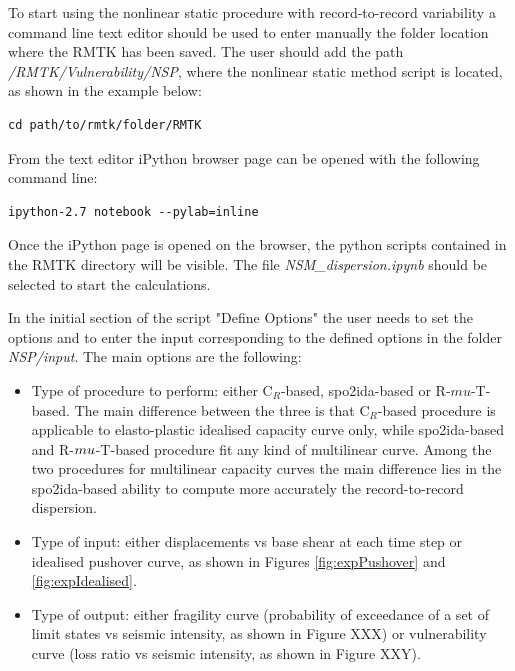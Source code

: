 To start using the nonlinear static procedure with record-to-record variability a command line text editor should be used to enter manually the folder location where the RMTK has been saved. The user should add the path \textit{/RMTK/Vulnerability/NSP}, where the nonlinear static method script is located, as shown in the example below:

\begin{Verbatim}[frame=single, commandchars=\\\{\}, samepage=true]
cd path/to/rmtk/folder/RMTK
\end{Verbatim}

From the text editor iPython browser page can be opened with the following command line:

\begin{Verbatim}[frame=single, commandchars=\\\{\}, samepage=true]
ipython-2.7 notebook --pylab=inline
\end{Verbatim}

Once the iPython page is opened on the browser, the python scripts contained in the RMTK directory will be visible. The file \textit{NSM\_dispersion.ipynb} should be selected to start the calculations.

In the initial section of the script "Define Options" the user needs to set the options and to enter the input corresponding to the defined options in the folder \textit{NSP/input}. The main options are the following:

\begin{itemize}
\item Type of procedure to perform: either C$_R$-based, spo2ida-based or R-$mu$-T-based. The main difference between the three is that C$_R$-based procedure is applicable to elasto-plastic idealised capacity curve only, while spo2ida-based and R-$\\mu$-T-based procedure fit any kind of multilinear curve. Among the two procedures for multilinear capacity curves the main difference lies in the spo2ida-based ability to compute more accurately the record-to-record dispersion. 
\item Type of input: either displacements vs base shear at each time step or idealised pushover curve, as shown in Figures \ref{fig:expPushover} and \ref{fig:expIdealised}.
\item Type of output: either fragility curve (probability of exceedance of a set of limit states vs seismic intensity, as shown in Figure XXX) or vulnerability curve (loss ratio vs seismic intensity, as shown in Figure XXY).
\end{itemize}

